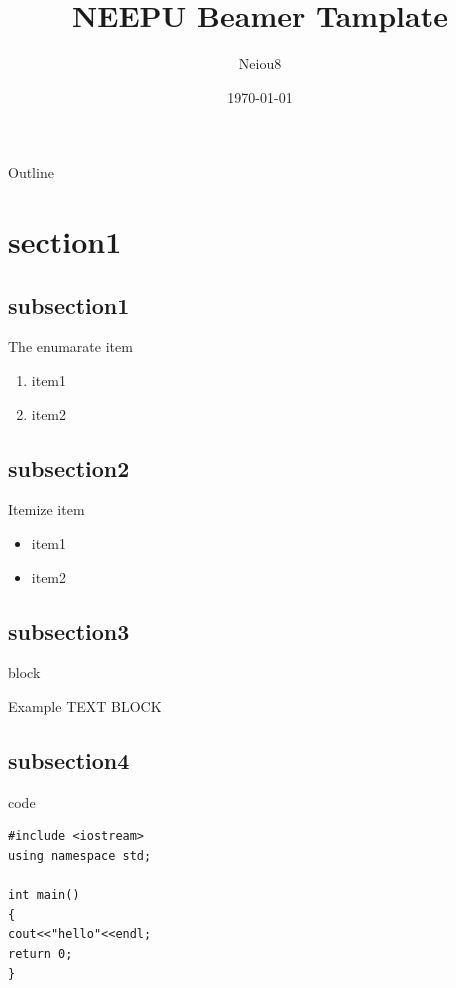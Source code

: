 \documentclass[UTF8,11pt]{beamer}
\title{NEEPU Beamer Tamplate}
\author{Neiou8}
\date{\today}
\institute{Northeast Electric Power University}
\begin{document}
\begin{frame}
    \titlepage
\end{frame}

\begin{frame}{Outline}
	\tableofcontents
\end{frame}

\section{section1}
\subsection{subsection1}
\begin{frame}{The enumarate item}
	\begin{enumerate}
		\item item1
		\item item2
	\end{enumerate}
\end{frame}


\subsection{subsection2}
\begin{frame}{Itemize item}
	\begin{itemize}
		\item item1
		\item item2
	\end{itemize}
\end{frame}


\subsection{subsection3}
\begin{frame}{block}
	\begin{block}{Example}
		TEXT BLOCK
	\end{block}
\end{frame}


\subsection{subsection4}
\begin{frame}[fragile]{code}
	\lstset{language=C}
\begin{lstlisting}
#include <iostream>
using namespace std;

int main()
{
cout<<"hello"<<endl;
return 0;
}
\end{lstlisting}
\end{frame}
\end{document}
